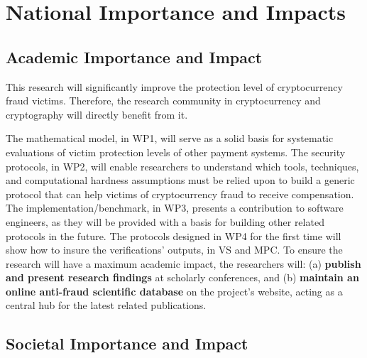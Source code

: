  
\vspace{-5mm}

\section{National Importance and Impacts}

\vspace{-2.5mm}
\subsection{Academic Importance and Impact}
\vspace{-1.2mm}

This research will significantly improve the protection level of cryptocurrency fraud victims. Therefore, the research community in cryptocurrency and cryptography will directly benefit from it. 



The mathematical model, in WP1, will serve as a solid basis for systematic evaluations of victim protection levels of other payment systems. The security protocols, in WP2, will enable researchers to understand which tools, techniques, and computational hardness assumptions must be relied upon to build a generic protocol that can help victims of cryptocurrency fraud to receive compensation. The implementation/benchmark, in WP3, presents a contribution to software engineers, as they will be provided with a basis for building other related protocols in the future. The protocols designed in WP4 for the first time will show how to insure the verifications' outputs, in VS and MPC. To ensure the research will have a maximum academic impact, the researchers will: (a) \textbf{publish and present research findings} at scholarly conferences, and (b) \textbf{maintain an online anti-fraud scientific database} on the project's website, acting as a central hub for the latest related publications.%

\vspace{-5mm}

\subsection{Societal Importance and Impact}
\vspace{-1mm}


